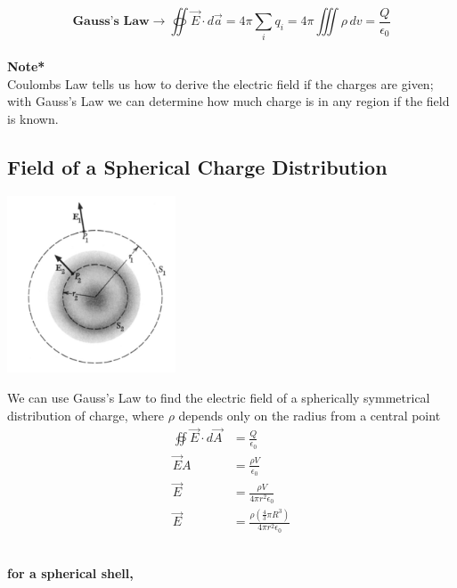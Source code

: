 \documentclass[svgnames]{article}
\begin{document}
\[ \textbf{Gauss's Law} \rightarrow  \oiint \vec{E} \cdot d\vec{a} = 4\pi \sum_i q_i = 4\pi \iiint \rho \, dv =  \frac{Q}{\epsilon_0} \] \\ 


\textbf{Note*} \\

Coulombs Law tells us how to derive the electric field if the charges are given; with Gauss's Law we can determine how much charge is in any region if the field is known. 

\subsection{Field of a Spherical Charge Distribution} 

\vspace{20px}

\begin{center}
\includegraphics[width=50mm]{ss6.png}
\end{center}


\vspace{20px}

We can use Gauss's Law to find the electric field of a spherically symmetrical distribution of charge, where $\rho$ depends only on the radius from a central point \\


\begin{align*}
\oiint \vec{E} \cdot d\vec{A} &= \frac{Q}{\epsilon_0} \\
\vec{E} A &= \frac{\rho V}{\epsilon_0} \\ 
\vec{E} &= \frac{\rho V}{4 \pi r^2 \epsilon_0} \\
\vec{E} &= \frac{\rho (\frac{4}{3}\pi R^3)}{4 \pi r^2 \epsilon_0}
\end{align*}\\
\begin{center}


\textbf{for a spherical shell,}
\end{center}
\end{document}
